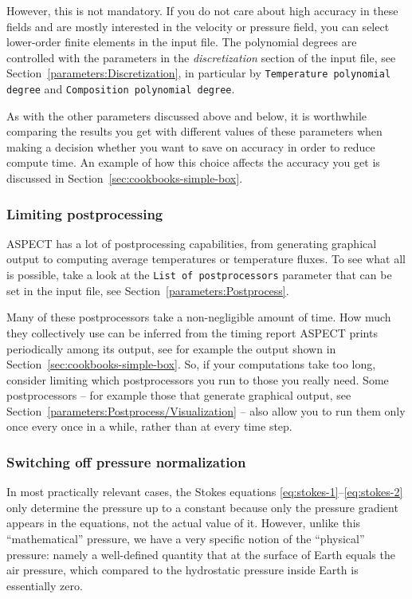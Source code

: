 \documentclass{article}
\newcommand{\aspect}{\textsc{ASPECT}}
\begin{document}
However, this is not mandatory. If you do not care about high accuracy in these
fields and are mostly interested in the velocity or pressure field, you can
select lower-order finite elements in the input file. The polynomial degrees are
controlled with the parameters in the \textit{discretization} section of the
input file, see Section~\ref{parameters:Discretization}, in particular by
\texttt{Temperature polynomial degree} and
\texttt{Composition polynomial degree}.

As with the other parameters discussed above and below, it is worthwhile
comparing the results you get with different values of these parameters when
making a decision whether you want to save on accuracy in order to reduce
compute time. An example of how this choice affects the accuracy you get is
discussed in Section~\ref{sec:cookbooks-simple-box}.



\subsubsection{Limiting postprocessing}
\aspect{} has a lot of postprocessing capabilities, from generating graphical
output to computing average temperatures or temperature fluxes. To see what all
is possible, take a look at the \texttt{List of postprocessors} parameter that
can be set in the input file, see Section~\ref{parameters:Postprocess}.

Many of these postprocessors take a non-negligible amount of time. How much they
collectively use can be inferred from the timing report \aspect{} prints
periodically among its output, see for example the output shown in
Section~\ref{sec:cookbooks-simple-box}. So, if your computations take too long,
consider limiting which postprocessors you run to those you really need. Some
postprocessors -- for example those that generate graphical output, see
Section~\ref{parameters:Postprocess/Visualization} -- also allow you to run them
only once every once in a while, rather than at every time step.


\subsubsection{Switching off pressure normalization}
In most practically relevant cases, the Stokes equations
\eqref{eq:stokes-1}--\eqref{eq:stokes-2} only determine the pressure up to a
constant because only the pressure gradient appears in the equations, not the
actual value of it. However, unlike this ``mathematical'' pressure, we have a
very specific notion of the ``physical'' pressure: namely a well-defined
quantity that at the surface of Earth equals the air pressure, which compared to
the hydrostatic pressure inside Earth is essentially zero.
\end{document}
